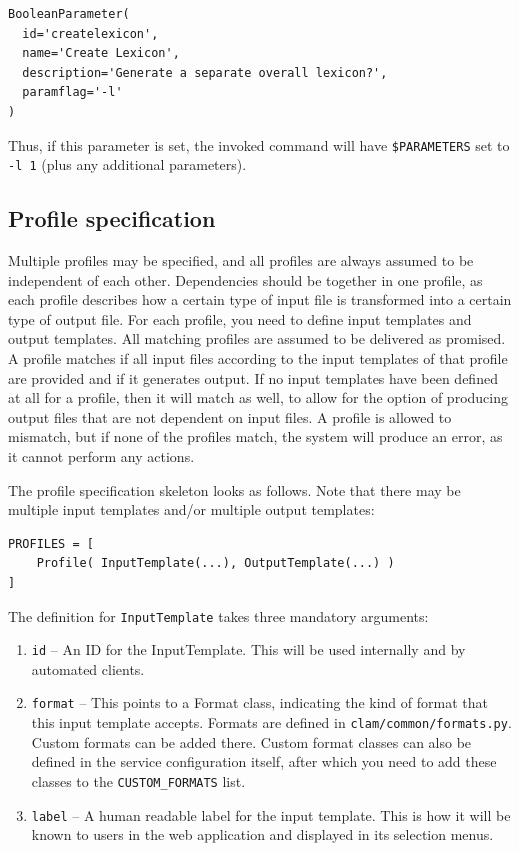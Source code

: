\documentclass[a4paper,12pt,twoside,openright]{report}
\begin{document}
{\small
\begin{verbatim}
BooleanParameter(
  id='createlexicon',
  name='Create Lexicon',
  description='Generate a separate overall lexicon?',
  paramflag='-l'
)
\end{verbatim}
}

Thus, if this parameter is set, the invoked command will have \texttt{\$PARAMETERS} set to \texttt{-l 1} (plus any additional parameters).

\subsection{Profile specification}

Multiple profiles may be specified, and all profiles are always assumed to be
independent of each other. Dependencies should be together in one profile, as
each profile describes how a certain type of input file is transformed into a
certain type of output file. For each profile, you need to define input
templates and output templates. All matching profiles are assumed to be
delivered as promised. A profile matches if all input files according to the
input templates of that profile are provided and if it generates output. If no
input templates have been defined at all for a profile, then it will match as
well, to allow for the option of producing output files that are not dependent
on input files. A profile is allowed to mismatch, but if none of the profiles
match, the system will produce an error, as it cannot perform any actions. 

The profile specification skeleton looks as follows. Note that there may be
multiple input templates and/or multiple output templates:

{\small
\begin{verbatim}
PROFILES = [ 
    Profile( InputTemplate(...), OutputTemplate(...) ) 
]
\end{verbatim}
}


The definition for \texttt{InputTemplate} takes three mandatory arguments:

\begin{enumerate}[leftmargin=5mm]
\item \texttt{id} -- An ID for the InputTemplate. This will be used internally and by automated clients.
\item \texttt{format} -- This points to a Format class, indicating the kind of format that this input template accepts. Formats are defined in \texttt{clam/common/formats.py}. Custom formats can be added there. Custom format classes can also be defined in the service configuration itself, after which you need to add these classes to the \texttt{CUSTOM\_FORMATS} list.
\item \texttt{label} -- A human readable label for the input template. This is how it will be known to users in the web application and displayed in its selection menus.
\end{enumerate}
\end{document}
